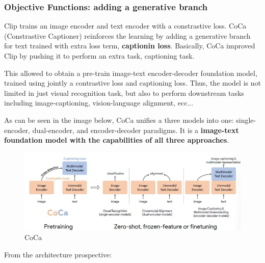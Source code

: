 \subsubsection{Objective Functions: adding a generative branch}

Clip trains an image encoder and text encoder with a constrastive loss. CoCa (Constrastive Captioner) reinforces the learning by adding a generative branch for text trained with extra loss term, \textbf{captionin loss}. Basically, CoCa improved Clip by pushing it to perform an extra task, captioning task.


This allowed to obtain a  pre-train image-text encoder-decoder foundation model, trained using jointly a contrastive loss and captioning loss. Thus, the model is not limited in  just visual recognition task, but also to perform downstream tasks including image-captioning, vision-language alignment, ecc...

As can be seen in the image below, CoCa unifies a three models into one: single-encoder, dual-encoder, and encoder-decoder paradigms. It is a \textbf{ image-text foundation model with the capabilities of all three approaches}.

\begin{figure}[H]
    \centering
    \includegraphics[width=1\linewidth]{tikz/CoCa.png}
    \caption{CoCa}
    \label{fig:CoCa}
\end{figure}

From the architecture prospective:

